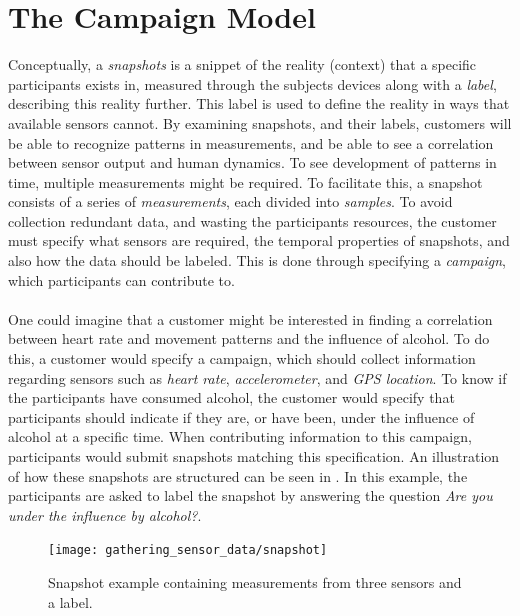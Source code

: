 
\section{The Campaign Model}
Conceptually, a \emph{snapshots} is a snippet of the reality (context) that a specific participants exists in, measured through the subjects devices along with a \emph{label}, describing this reality further. This label is used to define the reality in ways that available sensors cannot. By examining snapshots, and their labels, customers will be able to recognize patterns in measurements, and be able to see a correlation between sensor output and human dynamics. To see development of patterns in time, multiple measurements might be required. To facilitate this, a snapshot consists of a series of \emph{measurements}, each divided into \emph{samples}. To avoid collection redundant data, and wasting the participants resources, the customer must specify what sensors are required, the temporal properties of snapshots, and also how the data should be labeled. This is done through specifying a \emph{campaign}, which participants can contribute to. 
\\\\
One could imagine that a customer might be interested in finding a correlation between heart rate and movement patterns and the influence of alcohol. To do this, a customer would specify a campaign, which should collect information regarding sensors such as \emph{heart rate}, \emph{accelerometer}, and \emph{GPS location}. To know if the participants have consumed alcohol, the customer would specify that participants should indicate if they are, or have been, under the influence of alcohol at a specific time. When contributing information to this campaign, participants would submit snapshots matching this specification. An illustration of how these snapshots are structured can be seen in  . In this example, the participants are asked to label the snapshot by answering the question \emph{Are you under the influence by alcohol?}.

\begin{figure}[!htbp]
    \centering
    \texttt{[image: gathering\_sensor\_data/snapshot]}
    \caption{Snapshot example containing measurements from three sensors and a label.}
    \label{fig:snapshot_example}
\end{figure}
\FloatBarrier



